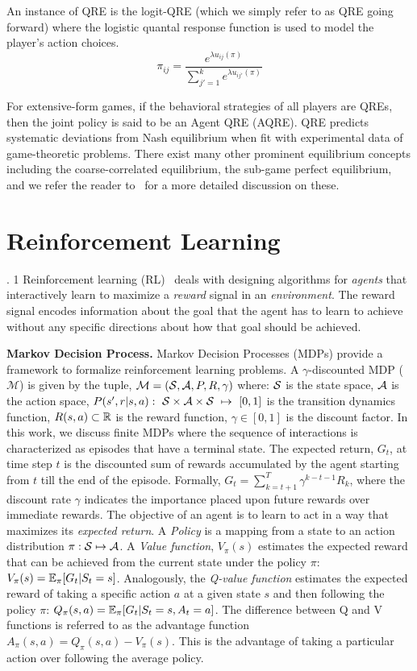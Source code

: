 An instance of QRE is the logit-QRE (which we simply refer to as QRE going forward) where the
logistic quantal response function is used to model the player's action choices.
$$ \pi_{ij} = \frac{e^{\lambda u_{ij}(\pi)}}{\sum_{j'=1}^k e^{\lambda u_{ij'}(\pi)}}$$

For extensive-form games, if the behavioral strategies of all players are QREs, then the joint
policy is said to be an Agent QRE (AQRE).
QRE predicts systematic deviations from Nash equilibrium when fit with experimental data of
game-theoretic problems.
There exist many other prominent equilibrium concepts including the coarse-correlated equilibrium,
the sub-game perfect equilibrium, and we refer the reader
to~\cite{shohamMultiagent2008,osborneintroduction2004} for a more detailed discussion on these.

\section{Reinforcement
  Learning}
.
1
Reinforcement learning (RL)~\cite{suttonReinforcement2018} deals with designing algorithms for
\textit{agents} that interactively learn to maximize a \textit{reward} signal in an
\textit{environment}.
The reward signal encodes information about the goal that the agent has to learn to achieve without
any specific directions about how that goal should be achieved.

\textbf{Markov Decision Process.}
Markov Decision Processes (MDPs) provide a framework to formalize reinforcement learning problems.
A $\gamma$-discounted MDP ($\mathcal{M}$) is given by the tuple, $\mathcal{M}=(\mathcal{S}, \mathcal{A}, P, R,
	\gamma)$ where: $\mathcal{S}$ is the state space, $\mathcal{A}$ is the action space,
$P(s',r|s,a):~\mathcal{S}\times\mathcal{A}\times\mathcal{S}~\mapsto~[0,1]$ is the transition dynamics function,
$R(s,a) \subset \mathbb{R}$ is the reward function, $\gamma \in [0,1]$ is the discount factor.
In this work, we discuss finite MDPs where the sequence of interactions is characterized as
episodes that have a terminal state.
The expected return, $G_t$, at time step $t$ is the discounted sum of rewards accumulated by the
agent starting from $t$ till the end of the episode.
Formally, $G_t = \sum_{k=t+1}^{T} \gamma^{k-t-1} R_k$, where the discount rate $\gamma$ indicates
the importance placed upon future rewards over immediate rewards.
The objective of an agent is to learn to act in a way that maximizes its \textit{expected return}.
A \textit{Policy} is a mapping from a state to an action distribution $\pi: \mathcal{S} \mapsto \mathcal{A}$.
A \textit{Value function}, $V_{\pi}(s)$ estimates the expected reward that can be achieved from the
current state under the policy $\pi$: $V_{\pi}(s) = \mathbb{E}_{\pi}[G_t | S_t = s]$.
Analogously, the \textit{Q-value function} estimates the expected reward of taking a specific
action $a$ at a given state $s$ and then following the policy $\pi$: $ Q_{\pi}(s, a) = \mathbb{E}_{\pi}[G_t
		| S_t = s, A_t = a] $.
The difference between Q and V functions is referred to as the advantage function $A_\pi(s,a) =
	Q_\pi(s,a) - V_\pi(s)$.
This is the advantage of taking a particular action over following the average policy.

